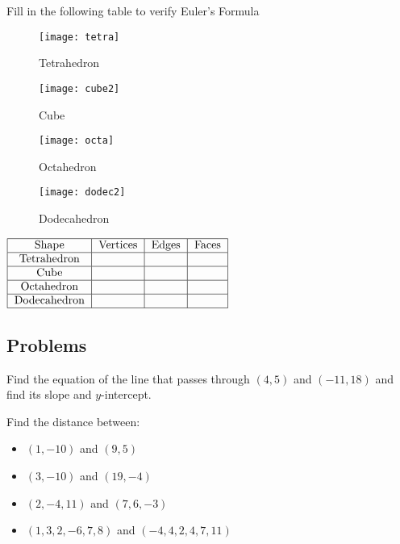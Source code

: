 \begin{problem}
Fill in the following table to verify Euler's Formula

\begin{figure}[H]
    
  \begin{minipage}[]{0.24\textwidth}
    \centering
    \texttt{[image: tetra]}
    \caption{Tetrahedron}
    \label{fig:tetra}
  \end{minipage}
  \begin{minipage}[]{0.22\textwidth}
    \centering
    \texttt{[image: cube2]}
    \caption{Cube}
    \label{fig:cube}
  \end{minipage}
  \begin{minipage}[]{0.25\textwidth}
    \centering
    \texttt{[image: octa]}
    \caption{Octahedron}
    \label{fig:octa}
  \end{minipage}
  \begin{minipage}[]{0.25\textwidth}
    \centering
    \texttt{[image: dodec2]}
    \caption{Dodecahedron}
    \label{fig:dodec}
  \end{minipage}
  
\end{figure}

\centering
\def\arraystretch{1.5}
$\begin{tabular}{|c|c|c|c|}\hline Shape & Vertices & Edges & Faces\\ 
\hline Tetrahedron &  & &  \\ 
\hline Cube &  &  & \\ 
\hline Octahedron &  &  & \\ 
\hline Dodecahedron & &  & \\ 
\hline 
\end{tabular}$
\end{problem}

\subsection{Problems}

\begin{problem}
Find the equation of the line that passes through $(4, 5)$ and $(-11, 18)$ and find its slope and $y$-intercept.
\end{problem}

\begin{problem}
Find the distance between:
\begin{itemize}
    \item $(1,-10)$ and $(9,5)$
    \item $(3,-10)$ and $(19,-4)$
    \item $(2,-4,11)$ and $(7,6,-3)$
    \item $(1, 3, 2, -6, 7, 8)$ and $(-4, 4, 2, 4, 7, 11)$
\end{itemize}
\end{problem}

